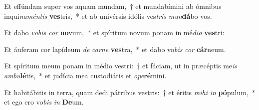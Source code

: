 \item Et effúndam super vos aquam mundam,~† et mundabímini ab ómnibus inqui\textit{na}\textit{mén}\textit{tis} \textbf{ves}tris,~* et ab univérsis idólis ves\textit{tris} \textit{mun}\textbf{dá}bo vos.
\item Et dabo \textit{vo}\textit{bis} \textit{cor} \textbf{no}vum,~* et spíritum novum ponam in mé\textit{di}\textit{o} \textbf{ves}tri:
\item Et áuferam cor lapídeum \textit{de} \textit{car}\textit{ne} \textbf{ves}tra,~* et dabo vo\textit{bis} \textit{cor} \textbf{cár}neum.
\item Et spíritum meum ponam in médio vestri:~† et fáciam, ut in præcéptis me\textit{is} \textit{am}\textit{bu}\textbf{lé}tis,~* et judícia mea custodiátis et \textit{o}\textit{pe}\textbf{ré}mini.
\item Et habitábitis in terra, quam dedi pátribus vestris:~† et éritis \textit{mi}\textit{hi} \textit{in} \textbf{pó}pulum,~* et ego ero vo\textit{bis} \textit{in} \textbf{De}um.
